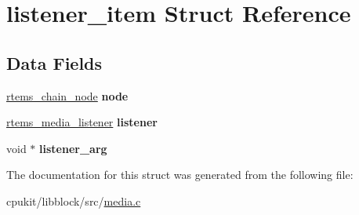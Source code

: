 \hypertarget{structlistener__item}{}\section{listener\+\_\+item Struct Reference}
\label{structlistener__item}
\subsection*{Data Fields}
\begin{DoxyCompactItemize}
\item 
\mbox{\label{structlistener__item_a60de1271bd9dd231e403459337796f00}} 
\mbox{\hyperlink{structChain__Node__struct}{rtems\+\_\+chain\+\_\+node}} {\bfseries node}
\item 
\mbox{\label{structlistener__item_a05a34657d1c47195de812e168eaa9456}} 
\mbox{\hyperlink{group__RTEMSIOMedia_ga8f3e1a300d58555b3c2921df90d2d637}{rtems\+\_\+media\+\_\+listener}} {\bfseries listener}
\item 
\mbox{\label{structlistener__item_a75ac7f6128e9a64a8d79b1524a724aba}} 
void $\ast$ {\bfseries listener\+\_\+arg}
\end{DoxyCompactItemize}


The documentation for this struct was generated from the following file\+:\begin{DoxyCompactItemize}
\item 
cpukit/libblock/src/\mbox{\hyperlink{media_8c}{media.\+c}}\end{DoxyCompactItemize}
